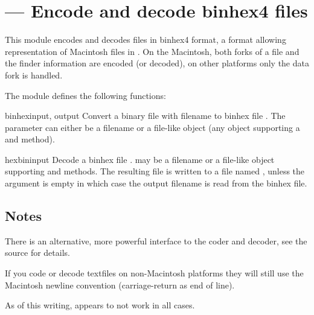 \section{ ---
         Encode and decode binhex4 files}



This module encodes and decodes files in binhex4 format, a format
allowing representation of Macintosh files in \ASCII{}. On the Macintosh,
both forks of a file and the finder information are encoded (or
decoded), on other platforms only the data fork is handled.

The  module defines the following functions:

\begin{funcdesc}{binhex}{input, output}
Convert a binary file with filename  to binhex file
. The  parameter can either be a filename or a
file-like object (any object supporting a  and 
method).
\end{funcdesc}

\begin{funcdesc}{hexbin}{input}
Decode a binhex file .  may be a filename or a
file-like object supporting  and  methods.
The resulting file is written to a file named , unless the
argument is empty in which case the output filename is read from the
binhex file.
\end{funcdesc}

\subsection{Notes \label{binhex-notes}}

There is an alternative, more powerful interface to the coder and
decoder, see the source for details.

If you code or decode textfiles on non-Macintosh platforms they will
still use the Macintosh newline convention (carriage-return as end of
line).

As of this writing,  appears to not work in all
cases.
